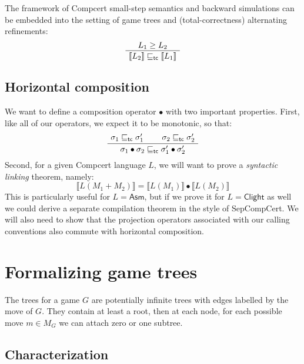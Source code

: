 \documentclass{article}
\newcommand{\kw}[1]{{\mathsf{#1}}}
\begin{document}
The framework of
Compcert small-step semantics and backward simulations
can be embedded into
the setting of game trees and (total-correctness) alternating refinements:
\begin{equation}
  \AxiomC{$L_1 \ge L_2$}
  \UnaryInfC{$\llbracket L_2 \rrbracket \sqsubseteq_\kw{tc} \llbracket L_1 \rrbracket$}
  \DisplayProof
  \label{eqn:hcompm}
\end{equation}

\subsection{Horizontal composition}

We want to define a composition operator $\bullet$
with two important properties.
First, like all of our operators,
we expect it to be monotonic, so that:
\begin{equation}
  \AxiomC{$\sigma_1 \sqsubseteq_\kw{tc} \sigma_1'$}
  \AxiomC{$\sigma_2 \sqsubseteq_\kw{tc} \sigma_2'$}
  \BinaryInfC{$\sigma_1 \bullet \sigma_2 \sqsubseteq_\kw{tc}
                \sigma_1' \bullet \sigma_2'$}
  \DisplayProof
  \label{eqn:embed}
\end{equation}
Second,
for a given Compcert language $L$,
we will want to prove a \emph{syntactic linking} theorem,
namely:
\begin{equation}
  \llbracket L(M_1 + M_2) \rrbracket =
  \llbracket L(M_1) \rrbracket \bullet
  \llbracket L(M_2) \rrbracket
  \label{eqn:slink}
\end{equation}
This is particularly useful for $L = \kw{Asm}$,
but if we prove it for $L = \kw{Clight}$ as well
we could derive a separate compilation theorem
in the style of SepCompCert.
We will also need to show that the projection operators
associated with our calling conventions
also commute with horizontal composition.

\section{Formalizing game trees}

The trees for a game $G$
are potentially infinite trees with
edges labelled by the move of $G$.
They contain at least a root,
then at each node,
for each possible move $m \in M_G$
we can attach zero or one subtree.

\subsection{Characterization}
\end{document}

